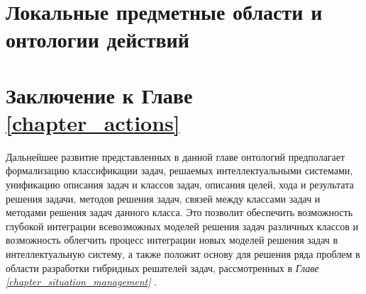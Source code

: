 \section{Локальные предметные области и онтологии действий}
\label{sec_local_sd_actions}

\section*{Заключение к Главе \ref{chapter_actions}}

Дальнейшее развитие представленных в данной главе онтологий предполагает формализацию классификации задач, решаемых интеллектуальными системами, унификацию описания задач и классов задач, описания целей, хода и результата решения задачи, методов решения задач, связей между классами задач и методами решения задач данного класса.
Это позволит обеспечить возможность глубокой интеграции всевозможных моделей решения задач различных классов и возможность облегчить процесс интеграции новых моделей решения задач в интеллектуальную систему, а также положит основу для решения ряда проблем в области разработки гибридных решателей задач, рассмотренных в \textit{Главе \ref{chapter_situation_management} }.

%
